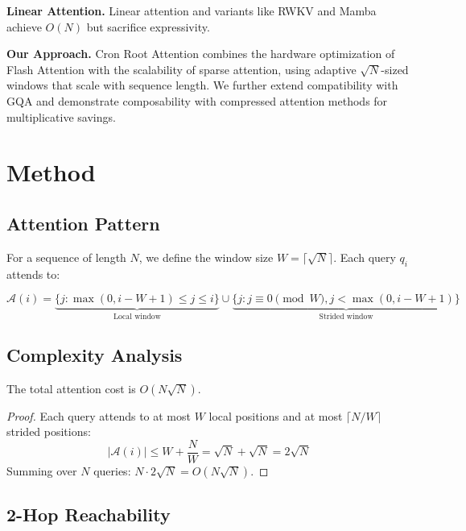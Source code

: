\documentclass{article}
\begin{document}
    \textbf{Linear Attention.} Linear attention \cite{linear_attention} and variants like RWKV \cite{rwkv} and Mamba \cite{mamba} achieve $O(N)$ but sacrifice expressivity.

    \textbf{Our Approach.} Cron Root Attention combines the hardware optimization of Flash Attention with the scalability of sparse attention, using adaptive $\sqrt{N}$-sized windows that scale with sequence length. We further extend compatibility with GQA \cite{gqa} and demonstrate composability with compressed attention methods for multiplicative savings.

    \section{Method}
    \label{sec:method}

    \subsection{Attention Pattern}

    For a sequence of length $N$, we define the window size $W = \lceil\sqrt{N}\rceil$. Each query $q_i$ attends to:

    \begin{equation}
    \mathcal{A}(i) = \underbrace{\{j : \max(0, i-W+1) \leq j \leq i\}}_{\text{Local window}} \cup \underbrace{\{j : j \equiv 0 \pmod{W}, j < \max(0, i-W+1)\}}_{\text{Strided window}}
    \end{equation}

    \subsection{Complexity Analysis}

    \begin{theorem}
    The total attention cost is $O(N\sqrt{N})$.
    \end{theorem}

    \begin{proof}
    Each query attends to at most $W$ local positions and at most $\lceil N/W \rceil$ strided positions:
    \begin{equation}
    |\mathcal{A}(i)| \leq W + \frac{N}{W} = \sqrt{N} + \sqrt{N} = 2\sqrt{N}
    \end{equation}
    Summing over $N$ queries: $N \cdot 2\sqrt{N} = O(N\sqrt{N})$.
    \end{proof}

    \subsection{2-Hop Reachability}
\end{document}
